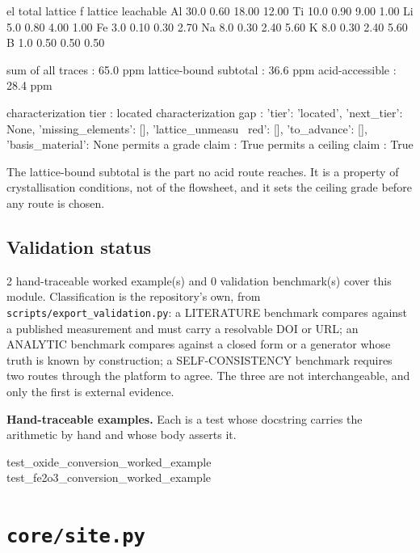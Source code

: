 \documentclass[10pt,a4paper,twoside]{report}
\begin{document}
\begin{outputblock}
el     total  lattice f   lattice  leachable
Al      30.0       0.60     18.00      12.00
Ti      10.0       0.90      9.00       1.00
Li       5.0       0.80      4.00       1.00
Fe       3.0       0.10      0.30       2.70
Na       8.0       0.30      2.40       5.60
K        8.0       0.30      2.40       5.60
B        1.0       0.50      0.50       0.50

sum of all traces       : 65.0 ppm
lattice-bound subtotal  : 36.6 ppm
acid-accessible         : 28.4 ppm

characterization tier   : located
characterization gap    : {'tier': 'located', 'next_tier': None, 'missing_elements': [], 'lattice_unmeasu
    \ red': [], 'to_advance': [], 'basis_material': None}
permits a grade claim   : True
permits a ceiling claim : True
\end{outputblock}

The lattice-bound subtotal is the part no acid route reaches. It is a property of crystallisation conditions, not of the flowsheet, and it sets the ceiling grade before any route is chosen.

\section{Validation status}

2 hand-traceable worked example(s) and 0 validation benchmark(s) cover this module. Classification is the repository's own, from \texttt{scripts/export\_validation.py}: a LITERATURE benchmark compares against a published measurement and must carry a resolvable DOI or URL; an ANALYTIC benchmark compares against a closed form or a generator whose truth is known by construction; a SELF-CONSISTENCY benchmark requires two routes through the platform to agree. The three are not interchangeable, and only the first is external evidence.

\textbf{Hand-traceable examples.} Each is a test whose docstring carries the arithmetic by hand and whose body asserts it.

\begin{verbatimsmall}
test_oxide_conversion_worked_example
test_fe2o3_conversion_worked_example
\end{verbatimsmall}

\clearpage

\chapter{\texttt{core/site.py}}\label{ch:site}
\end{document}
